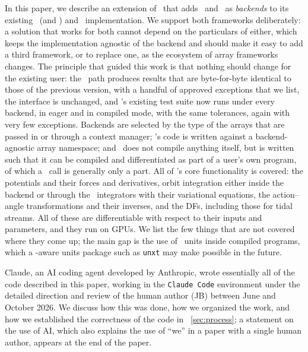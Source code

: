 In this paper, we describe an extension of \galpy\ that adds \jax\ and
\torch\ as \emph{backends} to its existing \numpy\ (and \scipy) and
\cc\ implementation. We support both frameworks deliberately: a
solution that works for both cannot depend on the particulars of
either, which keeps the implementation agnostic of the backend and
should make it easy to add a third framework, or to replace one, as the
ecosystem of array frameworks changes. The principle
that guided this work is that nothing should change for the existing
user: the \numpy\ path produces results that are byte-for-byte
identical to those of the previous version, with a handful of approved
exceptions that we list, the interface is unchanged, and \galpy's
existing test suite now runs under every backend, in eager and in
compiled mode, with the same tolerances, again with very few
exceptions. Backends are selected by the type of the arrays that are
passed in or through a context manager; \galpy's code is written
against a backend-agnostic array namespace; and \galpy\ does not
compile anything itself, but is written such that it can be compiled
and differentiated as part of a user's own program, of which a \galpy\
call is generally only a part. All of \galpy's core functionality is
covered: the potentials and their forces and derivatives, orbit
integration either inside the backend or through the \cc\ integrators
with their variational equations, the action--angle transformations
and their inverses, and the DFs, including those for tidal
streams. All of these are differentiable with respect to their inputs
and parameters, and they run on GPUs. We list the few things that are
not covered where they come up; the main gap is the use of \astropy\
units inside compiled programs, which a \jax-aware units package such
as \texttt{unxt} \citep{Starkman2025} may make possible in the future.

Claude, an AI coding agent developed by Anthropic, wrote essentially all
of the code described in this paper, working in the \texttt{Claude Code}
environment under the detailed direction and review of the human author (JB)
between June and October 2026. We discuss how this was done, how we
organized the work, and how we established the correctness of the code
in \sectionname~\ref{sec:process}; a statement on the use of AI, which
also explains the use of ``we'' in a paper with a single human author,
appears at the end of the paper.

